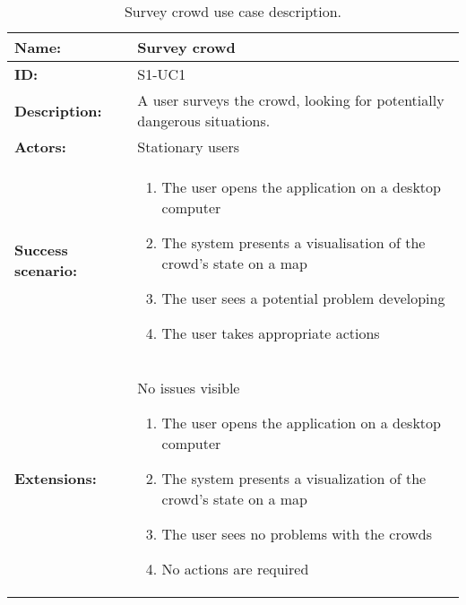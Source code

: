 \begin{table}[htbp]
    \centering
    \begin{tabularx}{\textwidth}{l X}
        \toprule
        \textbf{Name:}  & Survey crowd \\ \midrule
        \textbf{ID:}    & S1-UC1 \\ \midrule
        \textbf{Description:} & A user surveys the crowd, looking for potentially dangerous situations. \\ \midrule
        \textbf{Actors:} & Stationary users \\ \midrule
        \textbf{Success scenario:} & 
        \begin{enumerate}
            \item The user opens the application on a desktop computer
            \item The system presents a visualisation of the crowd's state on a map
            \item The user sees a potential problem developing
            \item The user takes appropriate actions
        \end{enumerate}
        \\ \midrule
        \textbf{Extensions:} & No issues visible
        \begin{enumerate}
            \item The user opens the application on a desktop computer
            \item The system presents a visualization of the crowd's state on a map
            \item The user sees no problems with the crowds
            \item No actions are required
        \end{enumerate} 
        \\ \bottomrule
    \end{tabularx}
    \caption{Survey crowd use case description.}
    \label{tab:s1-uc1}
\end{table}